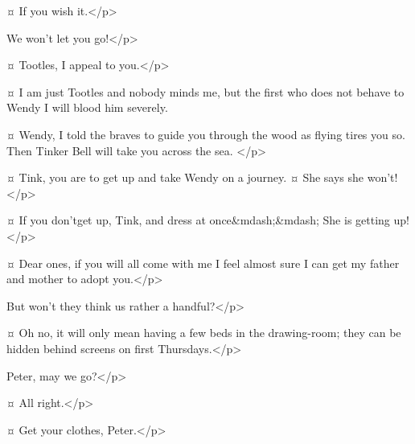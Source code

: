 \peterspeaks {}¤
If you wish it.</p>


\curlyspeaks
We won't let you go!</p>

\wendyspeaks {}¤
Tootles, I appeal to you.</p>

\tootlesspeaks {}¤
I am just Tootles and nobody minds me, but the first who does not behave to Wendy I will blood him severely.

\peterspeaks {}¤
Wendy, I told the braves to guide you through the wood as flying tires you so.
Then Tinker Bell will take you across the sea.
</p>

\nibsspeaks {}¤
Tink, you are to get up and take Wendy on a journey.
¤
She says she won't!</p>

\peterspeaks {}¤
If you don'tget up, Tink, and dress at once&mdash;&mdash; She is getting up!</p>

\wendyspeaks {}¤
Dear ones, if you will all come with me I feel almost sure I can get my father and mother to adopt you.</p>


\nibsspeaks
But won't they think us rather a handful?</p>

\wendyspeaks {}¤
Oh no, it will only mean having a few beds in the drawing-room; they can be hidden behind screens on first Thursdays.</p>


Peter, may we go?</p>

\peterspeaks {}¤
All right.</p>


\wendyspeaks {}¤
Get your clothes, Peter.</p>

